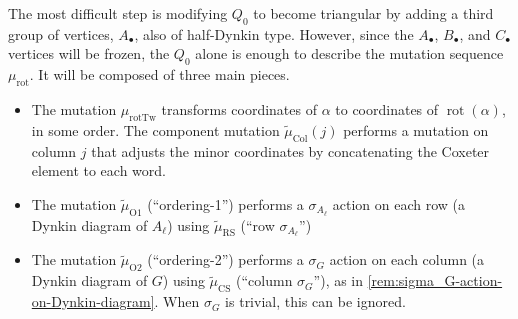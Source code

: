 \documentclass{amsart}
\theoremstyle{plain}
\theoremstyle{definition}
\theoremstyle{remark}
\newcommand{\murot}{{\mu_{\text{rot}}}}
\newcommand{\murottwist}{{\mu_{\text{rotTw}}}}
\newcommand{\muint}[1]{\widetilde{\mu}_{\text{#1}}}
\newcommand{\murowperm}{\muint{RS}}
\newcommand{\mucolperm}{\muint{CS}}
\newcommand{\mucol}{\muint{Col}}
\begin{document}
  The most difficult step is modifying $Q_0$ to become triangular by
  adding a third group of vertices, $A_{\bullet}$, also of half-Dynkin
  type. However, since the $A_{\bullet}$, $B_{\bullet}$, and
  $C_{\bullet}$ vertices will be frozen, the $Q_0$ alone is enough to
  describe the mutation sequence $\murot$. It will be composed of three
  main pieces.
  \begin{itemize}
  \item
    The mutation $\murottwist$ transforms coordinates of $\alpha$ to
    coordinates of $\operatorname{rot}(\alpha)$, in some order. The
    component mutation $\mucol(j)$ performs a mutation on column $j$
    that adjusts the minor coordinates by concatenating the Coxeter
    element to each word.
  \item
    The mutation $\muint{O1}$ (``ordering-1'') performs a
    $\sigma_{A_{\ell}}$ action on each row (a Dynkin diagram of
    $A_{\ell}$) using $\murowperm$ (``row $\sigma_{A_{\ell}}$'')
  \item
    The mutation $\muint{O2}$ (``ordering-2'') performs a $\sigma_G$
    action on each column (a Dynkin diagram of $G$) using $\mucolperm$
    (``column $\sigma_G$''), as in
    \cref{rem:sigma_G-action-on-Dynkin-diagram}. When $\sigma_G$ is
    trivial, this can be ignored.
  \end{itemize}
\end{document}
